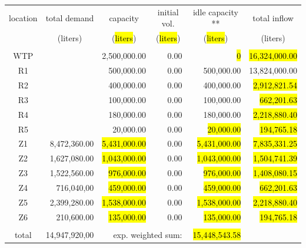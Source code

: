 \documentclass{singlecol}
\theoremstyle{TH}{
\newtheorem{lemma}{Lemma}
\newtheorem{theorem}[lemma]{Theorem}
\newtheorem{corrolary}[lemma]{Corrolary}
\newtheorem{conjecture}[lemma]{Conjecture}
\newtheorem{proposition}[lemma]{Proposition}
\newtheorem{claim}[lemma]{Claim}
\newtheorem{stheorem}[lemma]{Wrong Theorem}
\newtheorem{algorithm}{Algorithm}
}
\theoremstyle{THrm}{
\newtheorem{definition}{Definition}[section]
\newtheorem{question}{Question}[section]
\newtheorem{remark}{Remark}
\newtheorem{scheme}{Scheme}
}
\theoremstyle{THhit}{
\newtheorem{case}{Case}[section]
}
\begin{document}
\begin{table}[h!]
\begin{center}
\begin{small}
	\begin{tabular}{ c r r r r r } 
		location & \multicolumn{1}{c}{total demand}      & \multicolumn{1}{c}{capacity} & \multicolumn{1}{c}{initial vol.} & \multicolumn{1}{c}{idle capacity **} & \multicolumn{1}{c}{total inflow}  \\
		      & \multicolumn{1}{c}{(liters)} & \multicolumn{1}{c}{(\hl{liters})}   & \multicolumn{1}{c}{(\hl{liters})}     &  \multicolumn{1}{c}{(\hl{liters})}   &  \multicolumn{1}{c}{(liters)}               \\
		\\
		WTP   &               & 2,500,000.00        & 0.00 &  \hl{0} & \hl{16,324,000.00} \\
		R1    &                 &   500,000.00         & 0.00 &    500,000.00 & 13,824,000.00 \\
		R2    &                 &   400,000.00         & 0.00 &    400,000.00 &  \hl{2,912,821.54} \\
		R3    &                 &   100,000.00         & 0.00 &    100,000.00 &    \hl{662,201.63} \\
	    R4    &                     &   180,000.00         & 0.00 &    180,000.00 &  \hl{2,218,880.40} \\
	    R5    &                     &    20,000.00          & 0.00 &     \hl{20,000.00} &    \hl{194,765.18} \\
	    Z1    &  8,472,360.00 & \hl{5,431,000.00} & 0.00 &      \hl{5,431,000.00} &  \hl{7,835,331.25} \\
	    Z2    &  1,627,080.00 & \hl{1,043,000.00} & 0.00 &     \hl{1,043,000.00} &  \hl{1,504,741.39} \\
	    Z3    &  1,522,560.00 &    \hl{976,000.00} & 0.00 &     \hl{976,000.00} &  \hl{1,408,080.15} \\
	    Z4    &    716,040,00 &     \hl{459,000.00} & 0.00 &     \hl{459,000.00} &    \hl{662,201.63} \\
	    Z5    &  2,399,280.00 &  \hl{1,538,000.00} & 0.00 &    \hl{1,538,000.00} &   \hl{2,218,880.40} \\
	    Z6    &    210,600.00 &     \hl{135,000.00} & 0.00 &     \hl{135,000.00} &    \hl{194,765.18} \\
	    \\
	    total & 14,947,920,00 & \multicolumn{2}{r}{exp. weighted sum:} & \hl{15,448,543.58}   & \\

\end{tabular}
\end{small}
\end{center}
\end{table}
\end{document}
